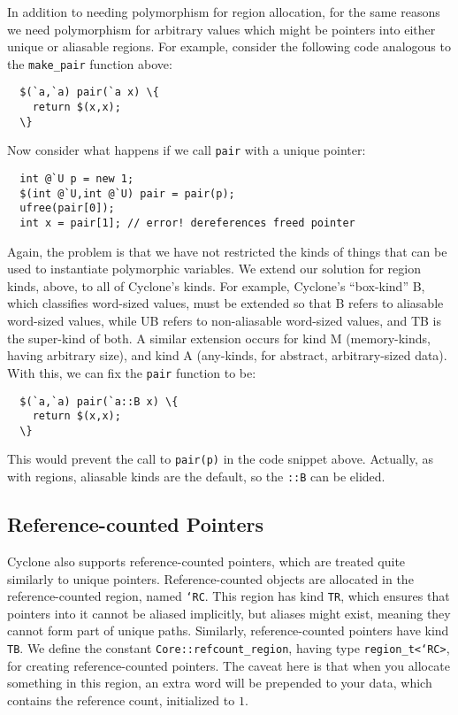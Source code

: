 In addition to needing polymorphism for region allocation, for the same
reasons we need polymorphism for arbitrary values which might be pointers
into either unique or aliasable regions.  For example, consider the
following code analogous to the \texttt{make\_pair} function above:
\begin{verbatim}
  $(`a,`a) pair(`a x) \{
    return $(x,x);
  \}
\end{verbatim}
Now consider what happens if we call \texttt{pair} with a unique pointer:
\begin{verbatim}
  int @`U p = new 1;
  $(int @`U,int @`U) pair = pair(p);
  ufree(pair[0]);
  int x = pair[1]; // error! dereferences freed pointer
\end{verbatim}%
Again, the problem is that we have not restricted the kinds of things that
can be used to instantiate polymorphic variables.  We extend our solution
for region kinds, above, to all of Cyclone's kinds.  For example, Cyclone's
``box-kind'' B, which classifies word-sized values, must be extended so that
B refers to aliasable word-sized values, while UB refers to non-aliasable
word-sized values, and TB is the super-kind of both.  A similar extension
occurs for kind M (memory-kinds, having arbitrary size), and kind A
(any-kinds, for abstract, arbitrary-sized data).  With this, we can fix the
\texttt{pair} function to be:
\begin{verbatim}
  $(`a,`a) pair(`a::B x) \{
    return $(x,x);
  \}
\end{verbatim}
This would prevent the call to \texttt{pair(p)} in the code snippet above.
Actually, as with regions, aliasable kinds are the default, so the
\texttt{::B} can be elided.

\subsection{Reference-counted Pointers}

Cyclone also supports reference-counted pointers, which are treated quite
similarly to unique pointers.  Reference-counted objects are allocated in
the reference-counted region, named \texttt{`RC}. This region has kind
\texttt{TR}, which ensures that pointers into it cannot be aliased
implicitly, but aliases might exist, meaning they cannot form part of unique
paths.  Similarly, reference-counted pointers have kind \texttt{TB}.  We
define the constant \texttt{Core::refcount_region}, having type
\texttt{region_t<`RC>}, for creating reference-counted pointers.  The caveat
here is that when you allocate something in this region, an extra word will
be prepended to your data, which contains the reference count, initialized
to $1$.

